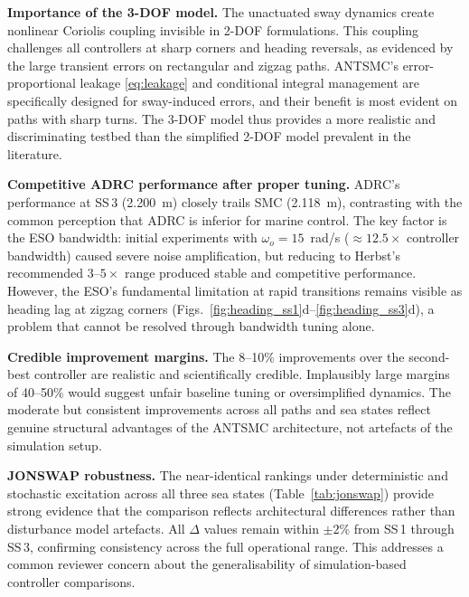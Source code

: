 \documentclass[review]{cas-dc}
\begin{document}
\textbf{Importance of the 3-DOF model.} The unactuated sway dynamics create nonlinear Coriolis coupling invisible in 2-DOF formulations. This coupling challenges all controllers at sharp corners and heading reversals, as evidenced by the large transient errors on rectangular and zigzag paths. ANTSMC's error-proportional leakage \eqref{eq:leakage} and conditional integral management are specifically designed for sway-induced errors, and their benefit is most evident on paths with sharp turns. The 3-DOF model thus provides a more realistic and discriminating testbed than the simplified 2-DOF model prevalent in the literature.

\textbf{Competitive ADRC performance after proper tuning.} ADRC's performance at SS\,3 (2.200~m) closely trails SMC (2.118~m), contrasting with the common perception that ADRC is inferior for marine control. The key factor is the ESO bandwidth: initial experiments with $\omega_o = 15$~rad/s ($\approx 12.5\times$ controller bandwidth) caused severe noise amplification, but reducing to Herbst's recommended $3$--$5\times$ range produced stable and competitive performance. However, the ESO's fundamental limitation at rapid transitions remains visible as heading lag at zigzag corners (Figs.~\ref{fig:heading_ss1}d--\ref{fig:heading_ss3}d), a problem that cannot be resolved through bandwidth tuning alone.

\textbf{Credible improvement margins.} The 8--10\% improvements over the second-best controller are realistic and scientifically credible. Implausibly large margins of 40--50\% would suggest unfair baseline tuning or oversimplified dynamics. The moderate but consistent improvements across all paths and sea states reflect genuine structural advantages of the ANTSMC architecture, not artefacts of the simulation setup.

\textbf{JONSWAP robustness.} The near-identical rankings under deterministic and stochastic excitation across all three sea states (Table~\ref{tab:jonswap}) provide strong evidence that the comparison reflects architectural differences rather than disturbance model artefacts. All $\Delta$ values remain within $\pm 2\%$ from SS\,1 through SS\,3, confirming consistency across the full operational range. This addresses a common reviewer concern about the generalisability of simulation-based controller comparisons.
\end{document}
